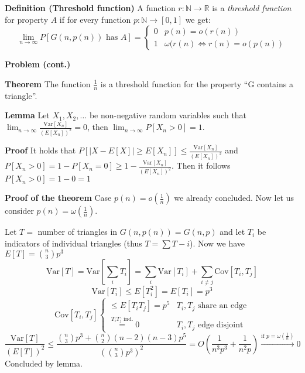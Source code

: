 \documentclass[a4paper]{article}
\begin{document}
\textbf{Definition (Threshold function)}
A function $r: \mathbb{N} \rightarrow \mathbb{R}$ is a \emph{threshold function} for property $A$ if for every function $p: \mathbb{N} \rightarrow [0,1]$ we get:
$$\lim_{n \rightarrow \infty} P[G(n, p(n)) \text{ has } A] = \begin{cases}
	0 & p(n) = o(r(n)) \\
	1 & \omega(r(n) \Leftrightarrow r(n) = o(p(n))
\end{cases}$$

\textbf{Problem (cont.)}

\textbf{Theorem}
The function $\frac{1}{n}$ is a threshold function for the property ``G contains a triangle''.

\textbf{Lemma}
Let $X_1, X_2, \ldots$ be non-negative random variables such that $\lim_{n \rightarrow \infty} \frac{\text{Var}[X_n]}{(E[X_n])^2} = 0$, then $\lim_{n \rightarrow \infty} P[X_n > 0] = 1$.

\textbf{Proof}
It holds that $P[|X - E[X]| \geq E[X_n]] \leq \frac{\text{Var}[X_n]}{(E[X_n])^2}$ and $P[X_n > 0] = 1-P[X_n = 0] \geq 1 - \frac{\text{Var}[X_n]}{(E[X_n])^2}$.
Then it follows $P[X_n > 0] = 1 - 0 = 1$

\textbf{Proof of the theorem}
Case $p(n) = o(\frac{1}{n})$ we already concluded.
Now let us consider $p(n) = \omega(\frac{1}{n})$.

Let $T =$ number of triangles in $G(n,p(n)) = G(n,p)$ and let $T_i$ be indicators of individual triangles (thus $T = \sum T-i$).
Now we have $E[T] = {n \choose 3} p^3$
$$\text{Var}[T] = \text{Var}\left[\sum_i T_i\right] = \sum_i \text{Var} [T_i] + \sum_{i \neq j} \text{Cov}[T_i, T_j]$$
$$\text{Var}[T_i] \leq E[T_i^2] = E[T_i] = p^3$$
$$\text{Cov}[T_i, T_j] \begin{cases}
	\leq E[T_i T_j] = p^5 & T_i, T_j \text{ share an edge} \\
	\stackrel{T_iT_j \text{ ind.}}{=} 0 & T_i, T_j \text{ edge disjoint}
\end{cases}$$
$$\frac{\text{Var}[T]}{(E[T])^2} \leq \frac{{n \choose 3} p^3 + {n \choose 2}(n-2)(n-3)p^5}{\left({n \choose 3} p^3\right)^2} = O\left(\frac{1}{n^3p^3} + \frac{1}{n^2p}\right) \stackrel{\text{if } p = \omega\left(\frac{1}{n}\right)}{\rightarrow} 0$$
Concluded by lemma.
\end{document}
